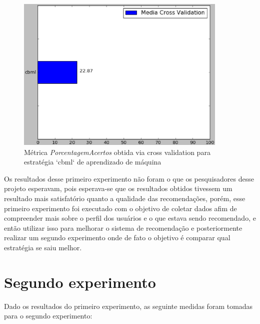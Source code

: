 \begin{figure}[h]
  \centering
  \includegraphics[width=0.9\textwidth]{figuras/primeiro_experimento_cross_validation.eps}
  \caption{Métrica \textit{PorcentagemAcertos} obtida via cross validation para
  estratégia `cbml` de aprendizado de máquina}
  \label{fig:primeiro_experimento_cross_validation}
\end{figure}

Os resultados desse primeiro experimento não foram o que os pesquisadores desse
projeto esperavam, pois esperava-se que os resultados obtidos tivessem um
resultado mais satisfatório quanto a qualidade das recomendações, porém, esse
primeiro experimento foi executado com o objetivo de coletar dados afim de
compreender mais sobre o perfil dos usuários e o que estava sendo recomendado,
e então utilizar isso para melhorar o sistema de recomendação e posteriormente
realizar um segundo experimento onde de fato o objetivo é comparar qual
estratégia se saiu melhor.

\section{Segundo experimento}

Dado os resultados do primeiro experimento, as seguinte medidas foram tomadas
para o segundo experimento:


